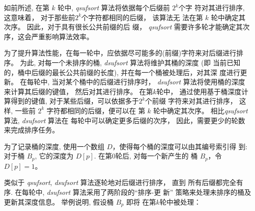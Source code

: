 \documentclass{ws-ijprai}
\begin{document}
如前所述, 在第 $k$ 轮中, \emph{qsufsort} 算法将依据每个后缀前 $2^k$个字
符对其进行排序, 这意味着， 对于那些前$2^k$个字符都相同的后缀， 该算法无
法在第 $k$ 轮中确定其次序。 因此，对于具有很长公共前缀的后
缀， \emph{qsufsort} 需要许多轮才能确定其次序，这会严重影响算法效率。

为了提升算法性能，在每一轮中，应依据尽可能多的(前缀)字符来对后缀进行排
序。 为此, 对每一个未排序的桶, \emph{dsufsort} 算法将维护其桶的深度 (即
当前已知的，桶中后缀的最长公共前缀的长度), 并在每一个桶被处理后，对其深
度进行更新。 在每轮中, 当对某个桶中的后缀进行排序时， \emph{dsufsort}
算法将使用桶的深度来计算其后缀的键值， 然后对其进行排序。 在第$k$轮中，
通过使用基于桶深度计算得到的键值, 对于某些后缀，可以依据多于$2^k$个前缀
字符来对其进行排序， 这样, 一些前 $2^k$ 字符都相同的后缀，便可以在
第 $k$ 轮中确定其次序。 相比\emph{qsufsort}算法, \emph{dsufsort} 算法在
每轮中可以确定更多后缀的次序， 因此，需要更少的轮数来完成排序任务。

为了记录桶的深度, 使用一个数组 $D$，使得每个桶的深度可以由其编号索引得
到: 对于桶 $B_p$, 它的深度为 $D[p]$. 在第0轮后, 对每一个新产生的
桶 $B_p$，令 $D[p] = 1$。

类似于 \emph{qsufsort}, \emph{dsufsort} 算法逐轮地对后缀进行排序， 直到
所有后缀都完全有序. 在每轮中, \emph{dsufsort} 算法采用了两阶段的“排序-更
新” 策略来处理未排序的桶及更新其深度信息。 举例说明, 假设桶 $B_p$ 即将
在第$k$轮中被处理：
\end{document}
